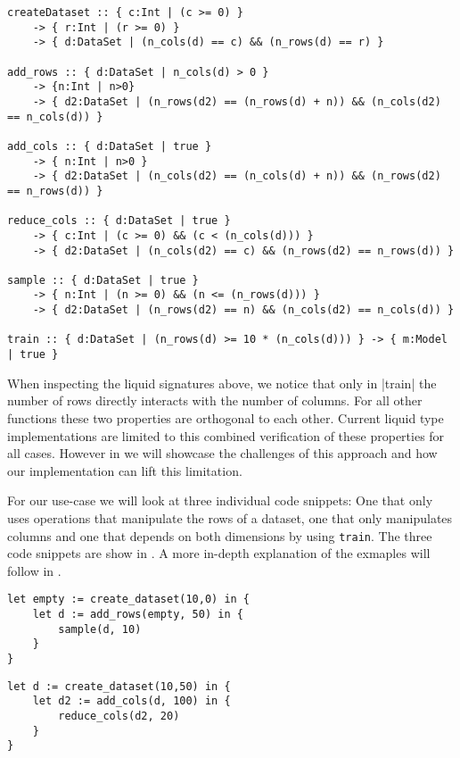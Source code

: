 \begin{lstlisting}[numbers=none,tabsize=8,caption={Liquid Signatures of functions in Use-Case 2},label={lst:uc2_liq_sig}]
createDataset :: { c:Int | (c >= 0) }
	-> { r:Int | (r >= 0) }
	-> { d:DataSet | (n_cols(d) == c) && (n_rows(d) == r) }

add_rows :: { d:DataSet | n_cols(d) > 0 }
	-> {n:Int | n>0} 
	-> { d2:DataSet | (n_rows(d2) == (n_rows(d) + n)) && (n_cols(d2) == n_cols(d)) }

add_cols :: { d:DataSet | true } 
	-> { n:Int | n>0 }
	-> { d2:DataSet | (n_cols(d2) == (n_cols(d) + n)) && (n_rows(d2) == n_rows(d)) }

reduce_cols :: { d:DataSet | true } 
	-> { c:Int | (c >= 0) && (c < (n_cols(d))) }
	-> { d2:DataSet | (n_cols(d2) == c) && (n_rows(d2) == n_rows(d)) }

sample :: { d:DataSet | true } 
	-> { n:Int | (n >= 0) && (n <= (n_rows(d))) } 
	-> { d2:DataSet | (n_rows(d2) == n) && (n_cols(d2) == n_cols(d)) }

train :: { d:DataSet | (n_rows(d) >= 10 * (n_cols(d))) } -> { m:Model | true }
\end{lstlisting}

When inspecting the liquid signatures above, we notice that only in |train| the number of rows directly interacts with the number of columns. For all other functions these two properties are orthogonal to each other. Current liquid type implementations are limited to this combined verification of these properties for all cases. However in  we will showcase the challenges of this approach and how our implementation can lift this limitation.

For our use-case we will look at three individual code snippets: One that only uses operations that manipulate the rows of a dataset, one that only manipulates columns and one that depends on both dimensions by using \texttt{train}. The three code snippets are show in . A more in-depth explanation of the exmaples will follow in .

\begin{minipage}{.45\textwidth}
\begin{lstlisting}[caption={Code example that only manipulates rows},label={lst:uc2_code1}]
let empty := create_dataset(10,0) in {
    let d := add_rows(empty, 50) in {
        sample(d, 10)
    }
}
\end{lstlisting}
\end{minipage}\hfill%
\begin{minipage}{.45\textwidth}
\begin{lstlisting}[caption={Code example that only manipulates columns},label={lst:uc2_code2}]
let d := create_dataset(10,50) in {
    let d2 := add_cols(d, 100) in {
        reduce_cols(d2, 20)
    }
}
\end{lstlisting}	
\end{minipage}

